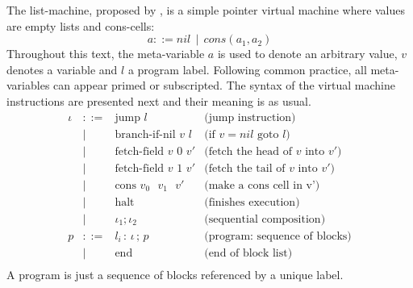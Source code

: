 \documentclass[sigconf]{acmart}
\theoremstyle{definition}
\begin{document}
The list-machine, proposed by \citet{Appel07}, is a simple pointer virtual machine where values
are empty lists and cons-cells:
\[
a ::= nil\,\mid\,cons(a_1,a_2)
\]
Throughout this text, the meta-variable $a$ is used to denote an arbitrary value, $v$ denotes a variable
and $l$ a program label. Following common practice, all meta-variables can
appear primed or subscripted. The syntax of the virtual machine instructions are
presented next and their meaning is as usual.
\[
\begin{array}{rcll}
  \iota & ::=  & \text{jump }l                       & \text{(jump instruction)}\\
        & \mid & \text{branch-if-nil $v$~$l$}            & \text{(if $v = nil$ goto $l$)}\\
        & \mid & \text{fetch-field $v$ 0 $v'$}       & \text{(fetch the head of $v$ into $v'$)}\\
        & \mid & \text{fetch-field  $v$ 1 $v'$}      & \text{(fetch the tail of $v$ into $v'$)}\\
        & \mid & \text{cons $v_0$ $v_1$ $v'$}        & \text{(make a cons cell in v')} \\
        & \mid & \text{halt}                         & \text{(finishes execution)}\\
        & \mid & \iota_1;\iota_2                             & \text{(sequential composition)}\\
      p & ::=  & l_i \,:\,\iota\,;\,p                    & \text{(program: sequence of blocks)}\\
        & \mid & \text{end}                          & \text{(end of block list)}\\
\end{array}
\]
A program is just a sequence of blocks referenced by a unique label. 
\end{document}
